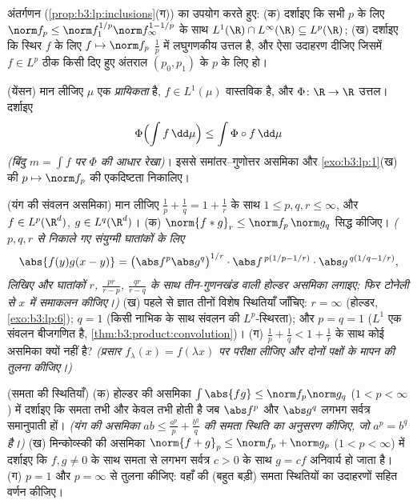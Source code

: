 \begin{exercise}[$\star\star$]\label{exo:b3:lp:9}
अंतर्गणन (\cref{prop:b3:lp:inclusions}(ग)) का उपयोग करते हुए:
(क) दर्शाइए कि सभी $p$ के लिए $\norm f_p \leq \norm f_1^{1/p}\norm
f_\infty^{1 - 1/p}$ के साथ $L^1(\R)\cap L^\infty(\R) \subseteq L^p(\R)$;
(ख) दर्शाइए कि स्थिर $f$ के लिए $f \mapsto \norm f_p$ $\frac1p$ में लघुगणकीय उत्तल
है, और ऐसा उदाहरण दीजिए जिसमें $f \in L^p$ ठीक किसी दिए हुए अंतराल
$(p_0, p_1)$ के $p$ के लिए हो।
\end{exercise}

\begin{exercise}[$\star\star$]\label{exo:b3:lp:10}
(येंसन) मान लीजिए $\mu$ एक \emph{प्रायिकता}  है, $f \in
L^1(\mu)$
वास्तविक है, और $\Phi \colon \R \to \R$ उत्तल। दर्शाइए
\[
\Phi\Bigl(\int f\,\dd\mu\Bigr) \leq \int \Phi\circ
f\,\dd\mu
\]
\emph{(बिंदु $m = \int f$ पर $\Phi$ की आधार रेखा)}। इससे
समांतर--गुणोत्तर असमिका और \cref{exo:b3:lp:1}(ख) की $p \mapsto \norm f_p$ की एकदिष्टता निकालिए।
\end{exercise}

\begin{exercise}[$\star\star\star$]\label{exo:b3:lp:11}
(यंग की संवलन असमिका) मान लीजिए $\frac1p + \frac1q = 1 + \frac1r$ के साथ $1 \leq p, q, r \leq
\infty$, और $f \in
L^p(\R^d)$,
$g \in L^q(\R^d)$।
(क) $\norm{f * g}_r \leq \norm f_p\,\norm g_q$ सिद्ध कीजिए। \emph{($p, q,
r$ से निकाले गए संयुग्मी घातांकों
के लिए
\[
\abs{f(y)g(x-y)} = \bigl(\abs f^p\abs g^q\bigr)^{1/r}
\cdot\abs f^{\,p(1/p - 1/r)}\cdot\abs g^{\,q(1/q - 1/r)},
\]
लिखिए और घातांकों $r$, $\frac{pr}{r - p}$, $\frac{qr}{r - q}$ के साथ तीन-गुणनखंड वाली
होल्डर असमिका लगाइए; फिर टोनेली से $x$ में समाकलन कीजिए।)}
(ख) पहले से ज्ञात तीनों विशेष स्थितियाँ जाँचिए: $r =
\infty$ (होल्डर,
\cref{exo:b3:lp:6}); $q = 1$ (किसी  नाभिक के साथ संवलन की $L^p$-स्थिरता);
और $p = q = 1$ ($L^1$ एक संवलन बीजगणित है, \cref{thm:b3:product:convolution})।
(ग) $\frac1p + \frac1q < 1 +
\frac1r$ के साथ कोई असमिका क्यों नहीं है? \emph{(प्रसार $f_\lambda(x) =
f(\lambda x)$ पर
परीक्षा लीजिए और दोनों पक्षों के मापन की तुलना कीजिए।)}
\end{exercise}

\begin{exercise}[$\star\star$]\label{exo:b3:lp:12}
(समता की स्थितियाँ) (क) होल्डर की असमिका $\int\abs{fg} \leq \norm f_p\norm g_q$ ($1 < p < \infty$) में
दर्शाइए कि समता तभी और केवल तभी होती है जब $\abs f^p$ और $\abs g^q$ लगभग
सर्वत्र समानुपाती हों। \emph{(यंग की असमिका $ab \leq \frac{a^p}p + \frac{b^q}q$ की समता स्थिति
का अनुसरण कीजिए, जो $a^p
= b^q$ है।)}
(ख) मिन्कोव्स्की की असमिका $\norm{f + g}_p \leq \norm f_p
+ \norm g_p$ ($1 < p < \infty$) में दर्शाइए कि $f,
g \neq 0$ के
साथ समता से लगभग सर्वत्र $c > 0$ के साथ $g = cf$ अनिवार्य हो जाता है।
(ग) $p = 1$ और $p = \infty$ से तुलना कीजिए: वहाँ की (बहुत बड़ी) समता
स्थितियों का उदाहरणों सहित वर्णन कीजिए।
\end{exercise}


